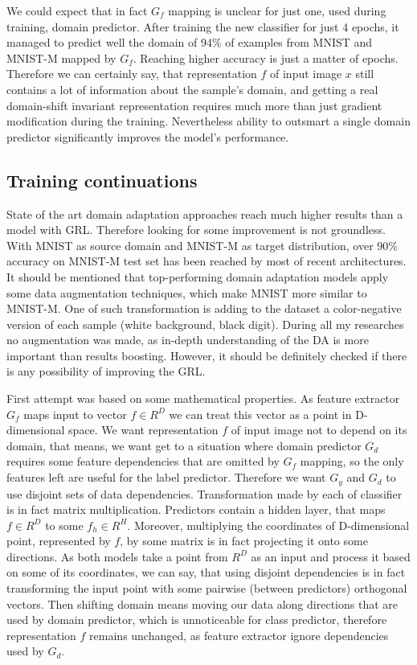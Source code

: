 \documentclass{article}
\begin{document}
\par
We could expect that in fact $G_{f}$ mapping is unclear for just one, used during training, domain predictor. After training the new classifier for just 4 epochs, it managed to predict well the domain of 94\% of examples from MNIST and MNIST-M mapped by $G_{f}$. Reaching higher accuracy is just a matter of epochs. Therefore we can certainly say, that representation $f$ of input image $x$ still contains a lot of information about the sample's domain, and getting a real domain-shift invariant representation requires much more than just gradient modification during the training. Nevertheless ability to outsmart a single domain predictor significantly improves the model's performance.

\subsection{Training continuations}
State of the art domain adaptation approaches reach much higher results than a model with GRL. Therefore looking for some improvement is not groundless. With MNIST as source domain and MNIST-M as target distribution, over 90\% accuracy on MNIST-M test set has been reached by most of recent architectures. It should be mentioned that top-performing domain adaptation models apply some data augmentation techniques, which make MNIST more similar to MNIST-M. One of such transformation is adding to the dataset a color-negative version of each sample (white background, black digit). During all my researches no augmentation was made, as in-depth understanding of the DA is more important than results boosting. However, it should be definitely checked if there is any possibility of improving the GRL.
\par
First attempt was based on some mathematical properties. As feature extractor $G_{f}$ maps input to vector $f \in R^{D}$ we can treat this vector as a point in D-dimensional space. We want representation $f$ of input image not to depend on its domain, that means, we want get to a situation where domain predictor $G_{d}$ requires some feature dependencies that are omitted by $G_{f}$ mapping, so the only features left are useful for the label predictor. Therefore we want $G_{y}$ and $G_{d}$ to use disjoint sets of data dependencies. Transformation made by each of classifier is in fact matrix multiplication. Predictors contain a hidden layer, that maps $f \in R^{D}$ to some $f_{h} \in R^{H}$. Moreover, multiplying the coordinates of D-dimensional point, represented by $f$, by some matrix is in fact projecting it onto some directions.  As both models take a point from $R^{D}$ as an input and process it based on some of its coordinates, we can say, that using disjoint dependencies is in fact transforming the input point with some pairwise (between predictors) orthogonal vectors. Then shifting domain means moving our data along directions that are used by domain predictor, which is unnoticeable for class predictor, therefore representation $f$ remains unchanged, as feature extractor ignore dependencies used by $G_{d}$.
\end{document}
